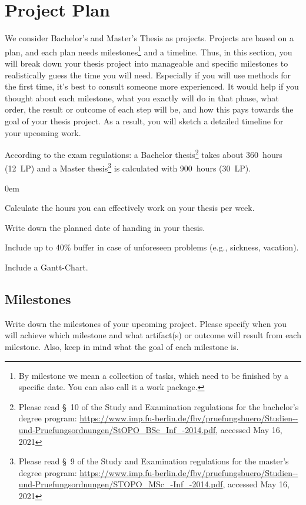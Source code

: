 \section{Project Plan}
\label{sec:plan}
We consider Bachelor's and Master's Thesis as projects. Projects are based on a plan, and each plan needs milestones\footnote{By milestone we mean a collection of tasks, which need to be finished by a specific date. You can also call it a work package.} and a timeline. Thus, in this section, you will break down your thesis project into manageable and specific milestones to realistically guess the time you will need. Especially if you will use methods for the first time, it's best to consult someone more experienced. It would help if you thought about each milestone, what you exactly will do in that phase, what order, the result or outcome of each step will be, and how this pays towards the goal of your thesis project. As a result, you will sketch a detailed timeline for your upcoming work.


According to the exam regulations: a Bachelor thesis\footnote{Please read \S~10 of the Study and Examination regulations for the bachelor’s degree program: \url{https://www.imp.fu-berlin.de/fbv/pruefungsbuero/Studien--und-Pruefungsordnungen/StOPO_BSc_Inf_-2014.pdf}, accessed May 16, 2021} takes about 360~hours (12~LP) and a Master thesis\footnote{Please read \S~9 of the Study and Examination regulations for the master’s
degree program: \url{https://www.imp.fu-berlin.de/fbv/pruefungsbuero/Studien--und-Pruefungsordnungen/STOPO_MSc_-Inf_-2014.pdf}, accessed May 16, 2021} is calculated with 900~hours (30~LP).

\begin{todolist}
  \itemsep0em %
  \item Calculate the hours you can effectively work on your thesis per week.
  \item Write down the planned date of handing in your thesis.
  \item Include up to 40\% buffer in case of unforeseen problems (e.g., sickness, vacation).
  \item Include a Gantt-Chart.
\end{todolist}

\subsection{Milestones}
\label{subsec:milestone}
Write down the milestones of your upcoming project. Please specify when you will achieve which milestone and what artifact(s) or outcome will result from each milestone. Also, keep in mind what the goal of each milestone is.

